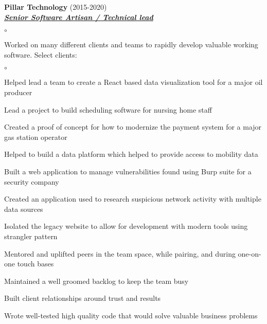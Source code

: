 \documentclass{article}
\newcommand{\employer}[3]{{ \textbf{#1} (#2)\\ \underline{\textbf{\emph{#3}}}\\  }}
\newenvironment{achievements}{\begin{list}{$\circ$}{\topsep 0pt \itemsep -2pt}}{\vspace*{4pt}\end{list}}
\begin{document}
\employer{Pillar Technology}{2015-2020}{Senior Software Artisan / Technical lead}
	\begin{achievements}
	\item Worked on many different clients and teams to rapidly develop valuable working software. Select clients:
	\begin{achievements}
		\item Helped lead a team to create a React based data visualization tool for a major oil producer
		\item Lead a project to build scheduling software for nursing home staff
		\item Created a proof of concept for how to modernize the payment system for a major gas station operator
		\item Helped to build a data platform which helped to provide access to mobility data
		\item Built a web application to manage vulnerabilities found using Burp suite for a security company
		\item Created an application used to research suspicious network activity with multiple data sources
		\item Isolated the legacy website to allow for development with modern tools using strangler pattern
	\end{achievements}
	\item Mentored and uplifted peers in the team space, while pairing, and during one-on-one touch bases
	\item Maintained a well groomed backlog to keep the team busy
	\item Built client relationships around trust and results
	\item Wrote well-tested high quality code that would solve valuable business problems
	\end{achievements}
\end{document}
